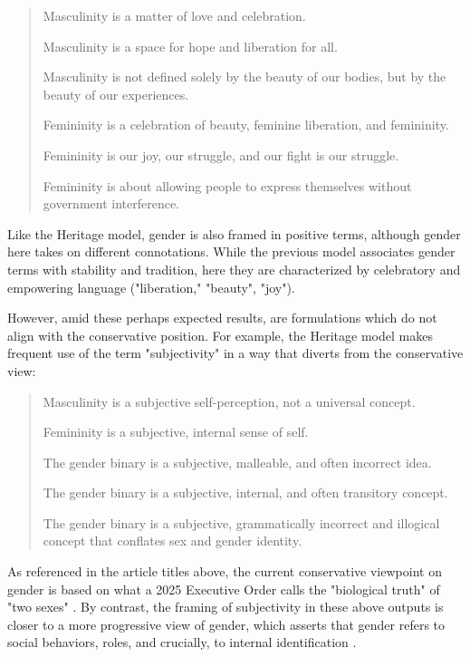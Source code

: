 \documentclass[letterpaper]{article} %
\begin{document}
\begin{quote}

Masculinity is a matter of love and celebration.

Masculinity is a space for hope and liberation for all.

Masculinity is not defined solely by the beauty of our bodies, but by
the beauty of our experiences.

Femininity is a celebration of beauty, feminine liberation, and
femininity.

Femininity is our joy, our struggle, and our fight is our struggle.

Femininity is about allowing people to express themselves without
government interference.

\end{quote}

Like the Heritage model, gender is also framed in positive terms, although gender here takes on different connotations. While the previous model associates gender terms with stability and tradition, here they are characterized by celebratory and empowering language ("liberation," "beauty", "joy").

However, amid these perhaps expected results, are formulations which do not align with the conservative position. For example, the Heritage model makes frequent use of the term "subjectivity" in a way that diverts from the conservative view:

\begin{quote}

Masculinity is a subjective self-perception, not a universal
concept.

Femininity is a subjective, internal sense of self.

The gender binary is a subjective, malleable, and often incorrect
idea.

The gender binary is a subjective, internal, and often transitory
concept.

The gender binary is a subjective, grammatically incorrect and
illogical concept that conflates sex and gender identity.

\end{quote}

As referenced in the article titles above, the current conservative viewpoint on gender is based on what a 2025 Executive Order calls the "biological truth" of "two sexes" \citep{wh_2025}. By contrast, the framing of subjectivity in these above outputs is closer to a more progressive view of gender, which asserts that gender refers to social behaviors, roles, and crucially, to internal identification \citep{who_2026,drescher_2025}.
\end{document}
